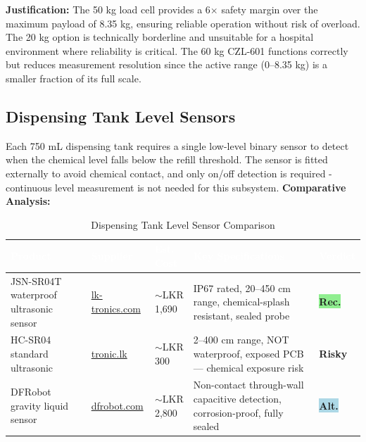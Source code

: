 \documentclass[12pt,a4paper]{article}
\newcommand{\badgegreen}[1]{%
  \colorbox{lightgreen}{\textcolor{badgegreen}{\footnotesize\textbf{#1}}}%
}
\newcommand{\badgered}[1]{%
  \colorbox{lightred}{\textcolor{badgered}{\footnotesize\textbf{#1}}}%
}
\newcommand{\badgeblue}[1]{%
  \colorbox{lightblue}{\textcolor{badgeblue}{\footnotesize\textbf{#1}}}%
}
\begin{document}
\noindent\textbf{Justification:} The 50 kg load cell provides a 6$\times$ safety margin over the maximum payload of 8.35 kg, ensuring reliable operation without risk of overload. The 20 kg option is technically borderline and unsuitable for a hospital environment where reliability is critical. The 60 kg CZL-601 functions correctly but reduces measurement resolution since the active range (0--8.35 kg) is a smaller fraction of its full scale.

\subsection{Dispensing Tank Level Sensors}

Each 750 mL dispensing tank requires a single low-level binary sensor to detect when the chemical level falls below the refill threshold. The sensor is fitted externally to avoid chemical contact, and only on/off detection is required - continuous level measurement is not needed for this subsystem.
\newpage
\vspace{0.3cm}
\noindent\textbf{Comparative Analysis:}

\begin{table}[H]
\centering
\setlength{\tabcolsep}{5pt}
\renewcommand{\arraystretch}{1.4}
\begin{tabular}{|p{3.2cm}|p{3.5cm}|p{2.2cm}|p{3.5cm}|p{2cm}|}
\hline
\rowcolor{headerblue}
\textcolor{white}{\textbf{Product}} &
\textcolor{white}{\textbf{Supplier}} &
\textcolor{white}{\textbf{Est. Cost}} &
\textcolor{white}{\textbf{Key Specifications}} &
\textcolor{white}{\textbf{Verdict}} \\
\hline
\rowcolor{chosen}
JSN-SR04T waterproof ultrasonic sensor &
\href{https://lk-tronics.com/product/jsn-sr04-waterproof-ultrasonic-distance-measuring-transducer-sensors/}{lk-tronics.com} &
$\sim$LKR 1,690 &
IP67 rated, 20--450 cm range, chemical-splash resistant, sealed probe &
\badgegreen{Rec.} \\
\hline
HC-SR04 standard ultrasonic &
\href{https://tronic.lk/product/hc-sr04-4pin-ultrasonic-sensor-module}{tronic.lk} &
$\sim$LKR 300 &
2--400 cm range, NOT waterproof, exposed PCB — chemical exposure risk &
\badgered{Risky} \\
\hline
DFRobot gravity liquid sensor &
\href{https://www.dfrobot.com/product-2059.html}{dfrobot.com} &
$\sim$LKR 2,800 &
Non-contact through-wall capacitive detection, corrosion-proof, fully sealed &
\badgeblue{Alt.} \\
\hline
\end{tabular}
\caption{Dispensing Tank Level Sensor Comparison}
\end{table}
\end{document}
